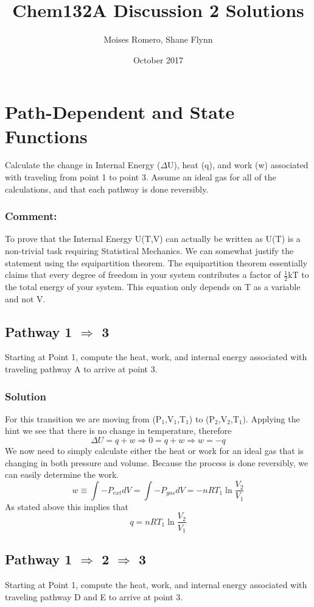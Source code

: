 \documentclass{article}
\title{Chem132A Discussion 2 Solutions}
\author{Moises Romero, Shane Flynn}
\date{October 2017}
\newcommand{\be}{\begin{equation}}
\newcommand{\ee}{\end{equation}}
\begin{document}
\maketitle

\section{Path-Dependent and State Functions}
Calculate the change in Internal Energy ($\Delta$U), heat (q), and work (w) associated with traveling from point 1 to point 3.
Assume an ideal gas for all of the calculations, and that each pathway is done reversibly. 

\subsubsection*{Comment:}
To prove that the Internal Energy U(T,V) can actually be written as U(T) is a non-trivial task requiring Statistical Mechanics. 
We can somewhat justify the statement using the equipartition theorem. 
The equipartition theorem essentially claims that every degree of freedom in your system contributes a factor of $\frac{1}{2}$kT to the total energy of your system. 
This equation only depends on T as a variable and not V.

\subsection{Pathway 1 $\Rightarrow$ 3}
Starting at Point 1, compute the heat, work, and internal energy associated with traveling pathway A to arrive at point 3.

\subsubsection{Solution}
For this transition we are moving from (P$_1$,V$_1$,T$_1$) to (P$_2$,V$_2$,T$_1$).
Applying the hint we see that there is no change in temperature, therefore
\be
\Delta U = q + w \Rightarrow 0 = q + w \Rightarrow w = -q
\ee
We now need to simply calculate either the heat or work for an ideal gas that is changing in both pressure and volume. 
Because the process is done reversibly, we can easily determine the work.
\be
w \equiv \int -P_{ext} dV = \int -P_{gas}dV = -nRT_1\ln\frac{V_2}{V_1}
\ee
As stated above this implies that
\be
q = nRT_1\ln\frac{V_2}{V_1}
\ee

\subsection{Pathway 1 $\Rightarrow$ 2 $\Rightarrow$ 3}
Starting at Point 1, compute the heat, work, and internal energy associated with traveling pathway D and E to arrive at point 3.
 
\end{document}
